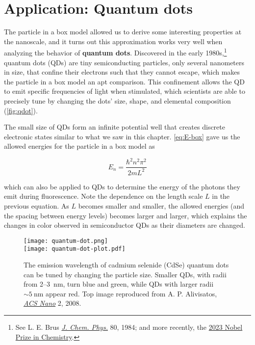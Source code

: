\section{Application: Quantum dots}

The particle in a box model allowed us to derive some interesting properties at the nanoscale, and it turns out this approximation works very well when analyzing the behavior of \textbf{quantum dots}. 
Discovered in the early 1980s,\footnote{See L. E. Brus \href{http://aip.scitation.org/doi/abs/10.1063/1.447218}{\emph{J. Chem. Phys.}} 80, 1984; and more recently, the \href{https://www.nobelprize.org/prizes/chemistry/2023/summary/}{2023 Nobel Prize in Chemistry}.} quantum dots (QDs) are tiny semiconducting particles, only several nanometers in size, that confine their electrons such that they cannot escape, which makes the particle in a box model an apt comparison. 
This confinement allows the QD to emit specific frequencies of light when stimulated, which scientists are able to precisely tune by changing the dots' size, shape, and elemental composition (\autoref{fig:qdot}).

The small size of QDs form an infinite potential well that creates discrete electronic states similar to what we saw in this chapter. 
\autoref{eq:E-box} gave us the allowed energies for the particle in a box model as

\begin{equation*}
	E_n = \frac{\hbar^2n^2\pi^2}{2mL^2}
\end{equation*}

\noindent which can also be applied to QDs to determine the energy of the photons they emit during fluorescence. 
Note the dependence on the length scale $L$ in the previous equation. 
As $L$ becomes smaller and smaller, the allowed energies (and the spacing between energy levels) becomes larger and larger, which explains the changes in color observed in semiconductor QDs as their diameters are changed.

\begin{figure}[!h]
	\centering
	\texttt{[image: quantum-dot.png]} \\
	\texttt{[image: quantum-dot-plot.pdf]}
	\caption{The emission wavelength of cadmium selenide (CdSe) quantum dots can be tuned by changing the particle size. 
	Smaller QDs, with radii from 2--\SI{3}{\nano\meter}, turn blue and green, while QDs with larger radii $\sim\SI{5}{\nano\meter}$ appear red. 
	Top image reproduced from A. P. Alivisatos, \href{http://pubs.acs.org/doi/abs/10.1021/nn800485f1}{\emph{ACS Nano}} 2, 2008.}
	\label{fig:qdot}
\end{figure}

